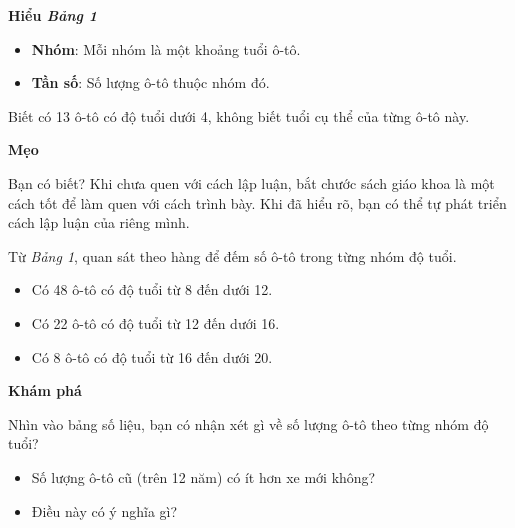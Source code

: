 \documentclass[
  letterpaper,
  DIV=11,
  numbers=noendperiod]{scrartcl}
\providecommand{\tightlist}{%
  \setlength{\itemsep}{0pt}\setlength{\parskip}{0pt}}\usepackage{longtable,booktabs,array}
\begin{document}
\begin{tcolorbox}[enhanced jigsaw, toprule=.15mm, colback=white, arc=.35mm, left=2mm, opacityback=0, breakable, rightrule=.15mm, bottomrule=.15mm, colframe=quarto-callout-note-color-frame, leftrule=.75mm]

\vspace{-3mm}\textbf{Hiểu \emph{Bảng 1}}\vspace{3mm}

\begin{itemize}
\tightlist
\item
  \textbf{Nhóm}: Mỗi nhóm là một khoảng tuổi ô-tô.
\item
  \textbf{Tần số}: Số lượng ô-tô thuộc nhóm đó.
\end{itemize}

Biết có 13 ô-tô có độ tuổi dưới 4, không biết tuổi cụ thể của từng ô-tô
này.

\end{tcolorbox}

\begin{tcolorbox}[enhanced jigsaw, toprule=.15mm, colback=white, arc=.35mm, left=2mm, opacityback=0, breakable, rightrule=.15mm, bottomrule=.15mm, colframe=quarto-callout-note-color-frame, leftrule=.75mm]

\vspace{-3mm}\textbf{Mẹo}\vspace{3mm}

Bạn có biết? Khi chưa quen với cách lập luận, bắt chước sách giáo khoa
là một cách tốt để làm quen với cách trình bày. Khi đã hiểu rõ, bạn có
thể tự phát triển cách lập luận của riêng mình.

\end{tcolorbox}

Từ \emph{Bảng 1}, quan sát theo hàng để đếm số ô-tô trong từng nhóm độ
tuổi.

\begin{itemize}
\tightlist
\item
  Có 48 ô-tô có độ tuổi từ 8 đến dưới 12.
\item
  Có 22 ô-tô có độ tuổi từ 12 đến dưới 16.
\item
  Có 8 ô-tô có độ tuổi từ 16 đến dưới 20.
\end{itemize}

\begin{tcolorbox}[enhanced jigsaw, toprule=.15mm, colback=white, arc=.35mm, left=2mm, opacityback=0, breakable, rightrule=.15mm, bottomrule=.15mm, colframe=quarto-callout-caution-color-frame, leftrule=.75mm]

\vspace{-3mm}\textbf{Khám phá}\vspace{3mm}

Nhìn vào bảng số liệu, bạn có nhận xét gì về số lượng ô-tô theo từng
nhóm độ tuổi?

\begin{itemize}
\tightlist
\item
  Số lượng ô-tô cũ (trên 12 năm) có ít hơn xe mới không?
\item
  Điều này có ý nghĩa gì?
\end{itemize}

\end{tcolorbox}
\end{document}
